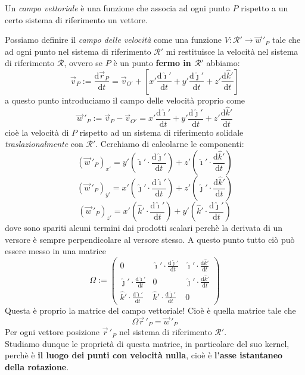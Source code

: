 \documentclass[11pt]{scrartcl}
\newcommand{\dif}{\text{d}}
\newcommand{\ihat}{\hat{\imath}}
\newcommand{\jhat}{\hat{\jmath}}
\newcommand{\khat}{\hat{k}}
\newcommand{\posit}{\vec{r}}
\begin{document}
	\begin{definition}
		Un \textit{campo vettoriale} è una funzione che associa ad ogni punto $P$ rispetto a un certo sistema di riferimento un vettore.
	\end{definition}
	Possiamo definire il \textit{campo delle velocità} come una funzione $V:\mathcal{R}'\to \vec{w}\,'_P$ tale che ad ogni punto nel sistema di riferimento $\mathcal{R}'$ mi restituisce la velocità nel sistema di riferimento $\mathcal{R}$, ovvero se $P$ è un punto \textbf{fermo in $\mathcal{R}'$} abbiamo:
	$$\vec{v}_P:=\frac{\dif \posit_P}{\dif t}=\vec{v}_{O'}+\left[x'\frac{\dif \ihat'}{\dif t}+y'\frac{\dif \jhat'}{\dif t}+z'\frac{\dif \khat'}{\dif t}\right]$$
	a questo punto introduciamo il campo delle velocità proprio come
	$$\vec{w}\,'_P:=\vec{v}_P-\vec{v}_{O'}=x'\frac{\dif \ihat'}{\dif t}+y'\frac{\dif \jhat'}{\dif t}+z'\frac{\dif \khat'}{\dif t}$$
	cioè la velocità di $P$ rispetto ad un sistema di riferimento solidale \textit{traslazionalmente} con $\mathcal{R}'$.
	Cerchiamo di calcolarne le componenti:
	$$\left(\vec{w}\,'_P\right)_{x'}=y'\left(\ihat' \cdot \frac{\dif \jhat'}{\dif t}\right)+z'\left(\ihat'\cdot \frac{\dif \khat'}{\dif t}\right)$$
	$$\left(\vec{w}\,'_P\right)_{y'}=x'\left(\jhat' \cdot \frac{\dif \ihat'}{\dif t}\right)+z'\left(\jhat'\cdot \frac{\dif \khat'}{\dif t}\right)$$
	$$\left(\vec{w}\,'_P\right)_{z'}=x'\left(\khat' \cdot \frac{\dif \ihat'}{\dif t}\right)+y'\left(\khat'\cdot \frac{\dif \jhat'}{\dif t}\right)$$
	dove sono spariti alcuni termini dai prodotti scalari perchè la derivata di un versore è sempre perpendicolare al versore stesso. A questo punto tutto ciò può essere messo in una matrice
	$$\Omega:=\begin{pmatrix}
		0 & \ihat' \cdot \frac{\dif \jhat'}{\dif t} & \ihat'\cdot \frac{\dif \khat'}{\dif t} \\
		\jhat' \cdot \frac{\dif \ihat'}{\dif t}  & 0 & \jhat'\cdot \frac{\dif \khat'}{\dif t} \\
		\khat' \cdot \frac{\dif \ihat'}{\dif t} & \khat'\cdot \frac{\dif \jhat'}{\dif t} & 0
	\end{pmatrix}$$
	Questa è proprio la matrice del campo vettoriale! Cioè è quella matrice tale che 
	$$\Omega \posit\,'_P=\vec{w}\,'_P$$
	Per ogni vettore posizione $\posit\,'_P$ nel sistema di riferimento $\mathcal{R}'$. \\
	Studiamo dunque le proprietà di questa matrice, in particolare del suo kernel, perchè è \textbf{il luogo dei punti con velocità nulla}, cioè è \textbf{l'asse istantaneo della rotazione}. \\
\end{document}
